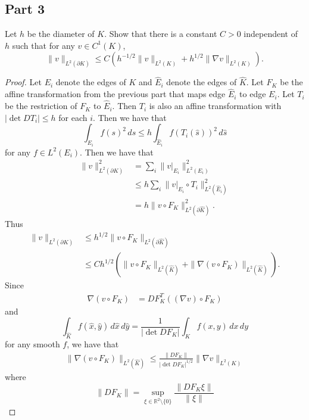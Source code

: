 \documentclass{article}
\theoremstyle{plain}
\begin{document}
\subsection*{Part 3}
Let $h$ be the diameter of $K$.
Show that there is a constant $C > 0$ independent of $h$ such that for any $v \in C^1(K)$,
\[\|v\|_{L^2(\partial  K)} \leq C(h^{-1/2}\|v\|_{L^2( K)} + h^{1/2}\|\nabla v\|_{L^2( K)}).\]
\begin{proof}
	Let $E_i$ denote the edges of $K$ and $\widehat E_i$ denote the edges of $\widehat K$.
	Let $F_K$ be the affine transformation from the previous part that maps edge $\widehat E_i$ to edge $E_i$.
	Let $T_i$ be the restriction of $F_K$ to $\widehat E_i$.
	Then $T_i$ is also an affine transformation with $|\det DT_i| \leq h$ for each $i$.
	Then we have that
	\begin{equation*}
		\int_{E_i}f(s)^2\,ds \leq h\int_{\widehat E_i}f(T_i(\widehat s))^2\,d\widehat s
	\end{equation*}
	for any $f \in L^2(E_i)$.
	Then we have that
	\begin{align*}
		\|v\|_{L^2(\partial K)}^2 & = \sum_i \|v|_{E_i}\|_{L^2(E_i)}^2                      \\
		                          & \leq h\sum_i\|v|_{E_i}\circ T_i\|_{L^2(\widehat E_i)}^2 \\
		                          & = h\|v\circ F_K\|_{L^2(\partial\widehat K)}^2.
	\end{align*}
	Thus
	\begin{align*}
		\|v\|_{L^2(\partial K)} & \leq h^{1/2}\|v\circ F_K\|_{L^2(\partial\widehat K)}                                                   \\
		                        & \leq Ch^{1/2}\left(\|v\circ F_K\|_{L^2(\widehat K)} + \|\nabla(v\circ F_K)\|_{L^2(\widehat K)}\right).
	\end{align*}
	Since
	\begin{align*}
		\nabla(v\circ F_K) & = DF_K^T((\nabla v)\circ F_K)
	\end{align*}
	and
	\begin{equation*}
		\int_{\widehat K}f(\widehat x,\widehat y)\,d\widehat x\,d\widehat y = \frac{1}{|\det DF_K|}\int_Kf(x,y)\,dx\,dy
	\end{equation*}
	for any smooth $f$, we have that
	\begin{align*}
		\|\nabla (v\circ F_K)\|_{L^2(\widehat K)} \leq \frac{\|DF_K\|}{|\det DF_K|^{1/2}}\|\nabla v\|_{L^2(K)}
	\end{align*}
	where
	\[\|DF_K\| = \sup_{\xi \in \mathbb R^2\setminus\{0\}} \frac{\|DF_K\xi\|}{\|\xi\|}\]


\end{proof}
\end{document}
